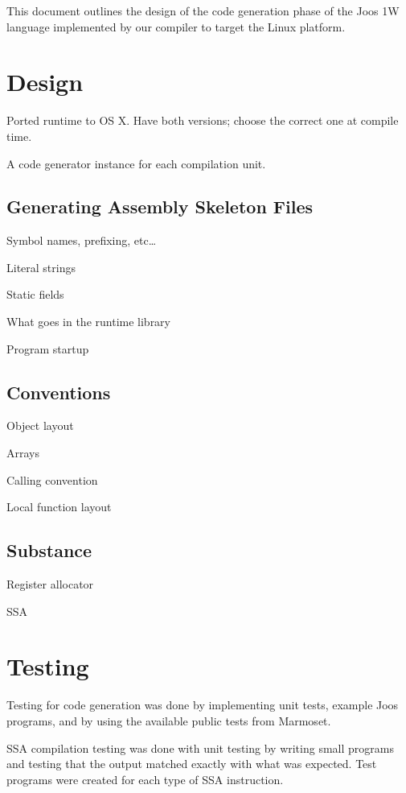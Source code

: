 \documentclass[pdftex,11pt,a4paper]{article}
\begin{document}

This document outlines the design of the code generation phase of
the Joos 1W language implemented by our compiler to target the
 Linux platform.


\section{Design}

Ported runtime to OS X. Have both versions; choose the correct one at
compile time.

A code generator instance for each compilation unit.


\subsection{Generating Assembly Skeleton Files}

Symbol names, prefixing, etc\ldots

Literal strings

Static fields

What goes in the runtime library

Program startup


\subsection{Conventions}

Object layout

Arrays

Calling convention

Local function layout


\subsection{Substance}

Register allocator

SSA


\section{Testing}

Testing for code generation was done by implementing unit tests,
example Joos programs, and by using the available public tests from
Marmoset.

SSA compilation testing was done with unit testing by writing small
programs and testing that the output matched exactly with what was
expected. Test programs were created for each type of SSA
instruction.
\end{document}
